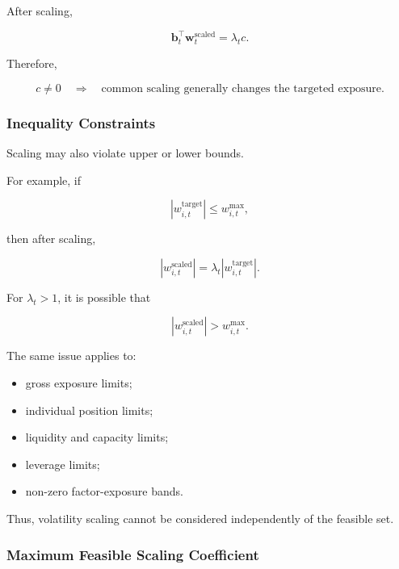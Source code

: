 \documentclass[11pt,a4paper]{article}
\begin{document}
After scaling,

\begin{equation}
\mathbf{b}_t^\top
\mathbf{w}_t^{\mathrm{scaled}}
=
\lambda_t c.
\end{equation}

Therefore,

\begin{equation}
\boxed{
c\neq0
\quad\Rightarrow\quad
\text{common scaling generally changes the targeted exposure}.
}
\end{equation}


\subsubsection{Inequality Constraints}

Scaling may also violate upper or lower bounds.

For example, if

\begin{equation}
|w_{i,t}^{\mathrm{target}}|
\leq
w_{i,t}^{\max},
\end{equation}

then after scaling,

\begin{equation}
|w_{i,t}^{\mathrm{scaled}}|
=
\lambda_t
|w_{i,t}^{\mathrm{target}}|.
\end{equation}

For $\lambda_t>1$, it is possible that

\begin{equation}
|w_{i,t}^{\mathrm{scaled}}|
>
w_{i,t}^{\max}.
\end{equation}

The same issue applies to:

\begin{itemize}
    \item gross exposure limits;
    \item individual position limits;
    \item liquidity and capacity limits;
    \item leverage limits;
    \item non-zero factor-exposure bands.
\end{itemize}

Thus, volatility scaling cannot be considered independently of the feasible set.


\subsubsection{Maximum Feasible Scaling Coefficient}
\end{document}
